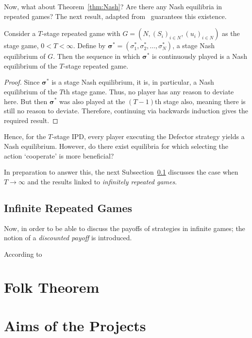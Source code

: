 Now, what about Theorem~\ref{thm:Nash}? Are there any Nash equilibria in
repeated games? The next result, adapted from~\cite{Knight2019a} guarantees 
this existence.
\begin{theorem}
    Consider a \(T\)-stage repeated game with \(G=(N, (S_{i})_{i \in N},
    (u_{i})_{i \in N})\) as the stage game, \(0 < T < \infty\). Define by
    \(\bm\sigma^{*} =(\sigma_{1}^{*}, \sigma_{2}^{*}, \ldots, \sigma_{N}^{*})\),
    a stage Nash equilibrium of \(G\). Then the sequence in which
    \(\bm\sigma^{*}\) is continuously played is a Nash equilibrium of the
    \(T\)-stage repeated game.
\end{theorem} 

\begin{proof}
    Since \(\bm\sigma^{*}\) is a stage Nash equilibrium, it is, in particular,
    a Nash equilibrium of the \(T\)th stage game. Thus, no player has any reason
    to deviate here. But then \(\bm\sigma^{*}\) was also played at the
    \((T-1)\)th stage also, meaning there is still no reason to deviate.
    Therefore, continuing via backwards induction gives the required result.
\end{proof}

Hence, for the \(T\)-stage IPD, every player executing the Defector strategy
yields a Nash equilibrium. However, do there exist equilibria for which
selecting the action `cooperate' is more beneficial?

In preparation to answer this, the next
Subsection~\ref{subsec:Infinite_Repeated_Games} discusses the case when \(T \to
\infty\) and the results linked to \emph{infinitely repeated games}.

\subsection{Infinite Repeated Games}\label{subsec:Infinite_Repeated_Games}
Now, in order to be able to discuss the payoffs of strategies in infinite games;
the notion of a \emph{discounted payoff} is introduced.

According to 


\section{Folk Theorem}\label{sec:Folk_Thm}



\section{Aims of the Projects}\label{sec:Aims_of_the_Project}